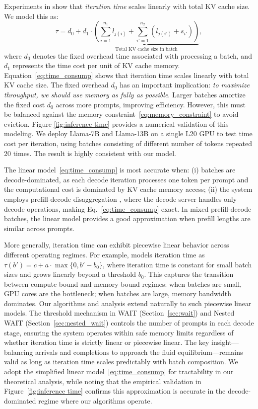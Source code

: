 Experiments in \cite{agrawal2023sarathi,kwon2023efficient,zhong2024distserve} show that \textit{iteration time} scales linearly with total KV cache size. We model this as:
\begin{equation}
\label{eq:time_consump}
    \tau = d_0 + d_1 \cdot \underbrace{\left( \sum_{i=1}^{n_1} l_{j(i)} + \sum_{i'=1}^{n_2} (l_{j(i')} + s_{i'}) \right)}_{\text{Total KV cache size in batch}},
\end{equation}
where \( d_0 \) denotes the fixed overhead time associated with processing a batch, and \( d_1 \) represents the time cost per unit of KV cache memory. Equation~\eqref{eq:time_consump} shows that iteration time scales linearly with total KV cache size. The fixed overhead $d_0$ has an important implication: \textit{to maximize throughput, we should use memory as fully as possible}. Larger batches amortize the fixed cost $d_0$ across more prompts, improving efficiency. However, this must be balanced against the memory constraint~\eqref{eq:memory_constraint} to avoid eviction. Figure \ref{fig:inference time} provides a numerical validation of this modeling. We deploy Llama-7B and Llama-13B on a single L20 GPU to test time cost per iteration, using batches consisting of different number of tokens repeated 20 times. The result is highly consistent with our model.

The linear model~\eqref{eq:time_consump} is most accurate when: (i) batches are decode-dominated, as each decode iteration processes one token per prompt and the computational cost is dominated by KV cache memory access; (ii) the system employs prefill-decode disaggregation \citep{zhong2024distserve,patel2024splitwise}, where the decode server handles only decode operations, making Eq.~\eqref{eq:time_consump} exact. In mixed prefill-decode batches, the linear model provides a good approximation when prefill lengths are similar across prompts.

More generally, iteration time can exhibit piecewise linear behavior across different operating regimes. For example, \cite{li2025throughput} models iteration time as $\tau(b') = c + a \cdot \max\{0, b' - b_0\}$, where iteration time is constant for small batch sizes and grows linearly beyond a threshold $b_0$. This captures the transition between compute-bound and memory-bound regimes: when batches are small, GPU cores are the bottleneck; when batches are large, memory bandwidth dominates. Our algorithms and analysis extend naturally to such piecewise linear models. The threshold mechanism in WAIT (Section~\ref{sec:wait}) and Nested WAIT (Section~\ref{sec:nested_wait}) controls the number of prompts in each decode stage, ensuring the system operates within safe memory limits regardless of whether iteration time is strictly linear or piecewise linear. The key insight—balancing arrivals and completions to approach the fluid equilibrium—remains valid as long as iteration time scales predictably with batch composition. We adopt the simplified linear model~\eqref{eq:time_consump} for tractability in our theoretical analysis, while noting that the empirical validation in Figure~\ref{fig:inference time} confirms this approximation is accurate in the decode-dominated regime where our algorithms operate.

